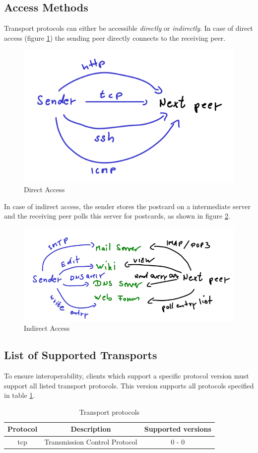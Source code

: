 \subsection{Access Methods}
\label{accessmethods}
Transport protocols can either be accessible \textit{directly} or 
\textit{indirectly}. In case of direct access (figure \ref{directaccess})
the sending peer directly connects to the receiving peer.
\begin{figure}
    \centering
    \caption{Direct Access}
    \label{directaccess}
    \includegraphics[scale=0.8]{directaccess.png}
\end{figure}
In case of indirect access, the sender stores the postcard on a intermediate
server and the receiving peer polls this server for postcards, as shown
in figure \ref{indirectaccess}.
\begin{figure}
    \centering
    \caption{Indirect Access}
    \label{indirectaccess}
    \includegraphics[scale=0.8]{indirectaccess.png}
\end{figure}
\subsection{List of Supported Transports}
To ensure interoperability, clients which support a specific
protocol version must support all listed transport protocols. This version
supports all protocols specified in table \ref{transportprotocollisting}.
\begin{longtable}{|c|c|c|}
\caption{Transport protocols}
\label{transportprotocollisting}
\\
\hline
\textbf{Protocol} & \textbf{Description} & \textbf{Supported versions}\\
\hline
tcp & Transmission Control Protocol & 0 - 0\\
\hline
\end{longtable}
